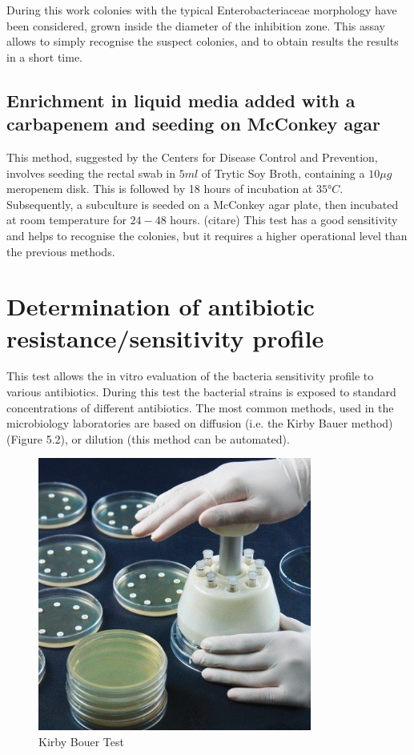 \documentclass[11pt]{report}
\begin{document}
During this work colonies with the typical Enterobacteriaceae morphology have been considered, grown inside the diameter of the inhibition zone.
This assay allows to simply recognise the suspect colonies, and to obtain results the results in a short time. 

\subsection{Enrichment in liquid media added with a carbapenem and seeding on McConkey agar}

This method, suggested by the Centers for Disease Control and Prevention, involves seeding the rectal swab in $5ml$ of Trytic Soy Broth, containing a $10\mu g$ meropenem disk.
This is followed by 18 hours of incubation at $35°C$.
Subsequently, a subculture is seeded on a McConkey agar plate, then incubated at room temperature for $24-48$ hours. (citare)
This test has a good sensitivity and helps to recognise the colonies, but it requires a higher operational level than the previous methods.

\section{Determination of antibiotic resistance/sensitivity profile}
This test allows the in vitro evaluation of the bacteria sensitivity profile to various antibiotics.
During this test the bacterial strains is exposed to standard concentrations of different antibiotics.
The most common methods, used in the microbiology laboratories are based on diffusion (i.e. the Kirby Bauer method) (Figure 5.2), or dilution (this method can be automated).

\begin{figure}[htp]
\centering
\includegraphics[scale=0.800]{img/Kirby_Bouer.jpg}
\caption{Kirby Bouer Test}
\label{}
\end{figure}
\end{document}
